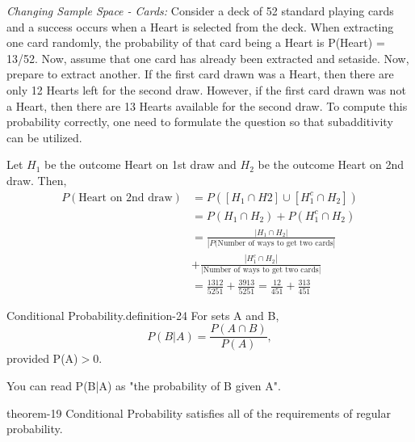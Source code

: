 \documentclass[10pt,]{book}
\numberwithin{equation}{section}
\newcommand{\gt}{>}
\begin{document}
\par
\hypertarget{p-542}{}%
\emph{Changing Sample Space - Cards:} Consider a deck of 52 standard playing cards and a success occurs when a Heart is selected from the deck. When extracting one card randomly, the probability	of that card being a Heart is P(Heart) = 13/52. Now, assume that one card has already been extracted and setaside.  Now, prepare to extract another. If the first card drawn was a Heart, then there are only 12 Hearts left for the second draw. However, if the first card drawn was not a Heart, then there are 13 Hearts available for the second draw. To compute this probability correctly, one need to formulate the question so that subadditivity can be utilized.%
\par
\hypertarget{p-543}{}%
Let \(H_1\) be the outcome Heart on 1st draw and \(H_2\) be the outcome Heart on 2nd draw. Then,%
\begin{align*}
P(\text{Heart on 2nd draw}) & = P( [ H_1 \cap H2 ] \cup [ H_1^c \cap H_2 ] )\\
& = P( H_1 \cap H_2 ) + P( H_1^c \cap H_2 )\\
& = \frac{ | H_1 \cap H_2 |}{| P( \text{Number of ways to get two cards} | }\\
& + \frac{ | H_1^c \cap H_2 | }{ | \text{Number of ways to get two cards} | }\\
& = \frac{13 12}{52 51} + \frac{39 13}{52 51} = \frac{12}{4 51} + \frac{3 13}{ 4 51}
\end{align*}
%
\par
\hypertarget{p-544}{}%
\begin{definition}{Conditional Probability.}{definition-24}%
\hypertarget{p-545}{}%
For sets A and B,%
\begin{equation*}
P(B | A) = \frac{P(A \cap B)}{ P(A) },
\end{equation*}
provided P(A)\(\gt 0\).%
\end{definition}
%
\par
\hypertarget{p-546}{}%
You can read P(B|A) as "the probability of B given A".%
\par
\hypertarget{p-547}{}%
\begin{theorem}{}{}{theorem-19}%
\hypertarget{p-548}{}%
Conditional Probability satisfies all of the requirements of regular probability.%
\end{theorem}
\end{document}
